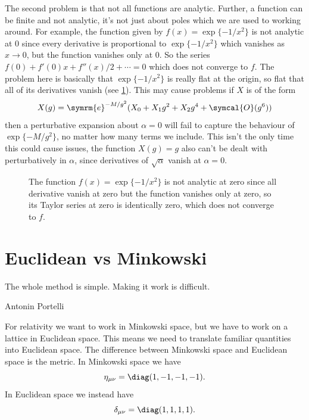 \documentclass[fleqn]{NotesClass}
\newcommand{\e}{\symrm{e}}
\newcommand{\order}{\symcal{O}}
\newcommand{\minkowskiMetric}{\eta}
\begin{document}
    The second problem is that not all functions are analytic.
    Further, a function can be finite and not analytic, it's not just about poles which we are used to working around.
    For example, the function given by \(f(x) = \exp\{-1/x^2\}\) is not analytic at 0 since every derivative is proportional to \(\exp\{-1/x^2\}\) which vanishes as \(x \to 0\), but the function vanishes only at \(0\).
    So the series \(f(0) + f'(0)x + f''(x)/2 + \dotsb = 0\) which does not converge to \(f\).
    The problem here is basically that \(\exp\{-1/x^2\}\) is really flat at the origin, so flat that all of its derivatives vanish (see \cref{fig:exp-1/x^2}).
    This may cause problems if \(X\) is of the form
    \begin{equation}
        X(g) = \e^{-M/g^2} (X_0 + X_1 g^2 + X_2g^4 + \order(g^6))
    \end{equation}
    then a perturbative expansion about \(\alpha = 0\) will fail to capture the behaviour of \(\exp\{-M/g^2\}\), no matter how many terms we include.
    This isn't the only time this could cause issues, the function \(X(g) = g\) also can't be dealt with perturbatively in \(\alpha\), since derivatives of \(\sqrt{\alpha}\) vanish at \(\alpha = 0\).
    
    \begin{figure}
        \caption{The function \(f(x) = \exp\{-1/x^2\}\) is not analytic at zero since all derivative vanish at zero but the function vanishes only at zero, so its Taylor series at zero is identically zero, which does not converge to \(f\).}
        \label{fig:exp-1/x^2}
    \end{figure}
    
    \section{Euclidean vs Minkowski}
    \epigraph{The whole method is simple. Making it work is difficult.}{Antonin Portelli}
    For relativity we want to work in Minkowski space, but we have to work on a lattice in Euclidean space.
    This means we need to translate familiar quantities into Euclidean space.
    The difference between Minkowski space and Euclidean space is the metric.
    In Minkowski space we have
    \begin{equation}
        \minkowskiMetric_{\mu\nu} = \diag(1, -1, -1, -1).
    \end{equation}
    In Euclidean space we instead have
    \begin{equation}
        \delta_{\mu\nu} = \diag(1, 1, 1, 1).
    \end{equation}
    
\end{document}
